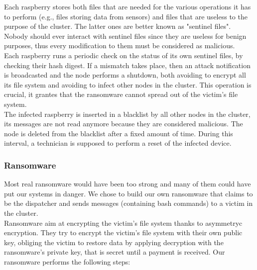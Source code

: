 \noindent Each raspberry stores both files that are needed for the various operations it has to perform (e.g., files storing data from sensors) and files that are useless to the purpose of the cluster. The latter ones are better known as "sentinel files". Nobody should ever interact with sentinel files since they are useless for benign purposes, thus every modification to them must be considered as malicious.\\
Each raspberry runs a periodic check on the status of its own sentinel files, by checking their hash digest. If a mismatch takes place, then an attack notification is broadcasted and the node performs a shutdown, both avoiding to encrypt all its file system and avoiding to infect other nodes in the cluster. This operation is crucial, it grantes that the ransomware cannot spread out of the victim's file system. \\
The infected raspberry is inserted in a blacklist by all other nodes in the cluster, its messages are not read anymore because they are considered malicious. The node is deleted from the blacklist after a fixed amount of time. During this interval, a technician is supposed to perform a reset of the infected device.\\

\subsubsection{Ransomware}

\noindent Most real ransomware would have been too strong and many of them could have put our systems in danger. We chose to build our own ransomware that claims to be the dispatcher and sends messages (containing bash commands) to a victim in the cluster. \\
Ransomware aim at encrypting the victim's file system thanks to asymmetryc encryption. They try to encrypt the victim's file system with their own public key, obliging the victim to restore data by applying decryption with the ransomware's private key, that is secret until a payment is received.
Our ransomware performs the following steps:


